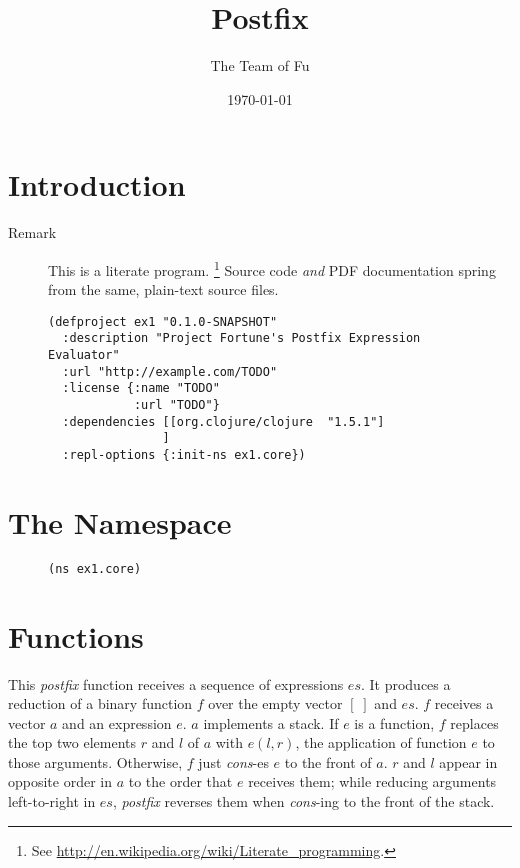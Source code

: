 \documentclass[11pt]{article}
\author{The Team of Fu}
\date{\today}
\title{Postfix}
\begin{document}
\maketitle
\tableofcontents


\section{Introduction}
\label{sec-1}
\begin{description}
\item[{Remark}] This is a literate program. 
\footnote{See \url{http://en.wikipedia.org/wiki/Literate_programming}.} 
Source code \emph{and} PDF documentation spring
from the same, plain-text source files.
\end{description}

\begin{figure}[H]
\label{project-file}
\begin{verbatim}
(defproject ex1 "0.1.0-SNAPSHOT"
  :description "Project Fortune's Postfix Expression Evaluator"
  :url "http://example.com/TODO"
  :license {:name "TODO"
            :url "TODO"}
  :dependencies [[org.clojure/clojure  "1.5.1"]
                ]
  :repl-options {:init-ns ex1.core})
\end{verbatim}
\end{figure}
\section{The Namespace}
\label{sec-2}

\begin{figure}[H]
\label{main-namespace}
\begin{verbatim}
(ns ex1.core)
\end{verbatim}
\end{figure}
\section{Functions}
\label{sec-3}

This \emph{postfix} function receives a sequence of expressions $es$. It
produces a reduction of a binary function $f$ over the empty vector
$[\;]$ and $es$. $f$ receives a vector $a$ and an expression $e$. $a$
implements a stack. If $e$ is a function, $f$ replaces the top two
elements $r$ and $l$ of $a$ with $e(l,r)$, the application of function
$e$ to those arguments. Otherwise, $f$ just \emph{cons}-es $e$ to the front
of $a$. $r$ and $l$ appear in opposite order in $a$ to the order that
$e$ receives them; while reducing arguments left-to-right in $es$,
\emph{postfix} reverses them when \emph{cons}-ing to the front of the stack.
\end{document}
